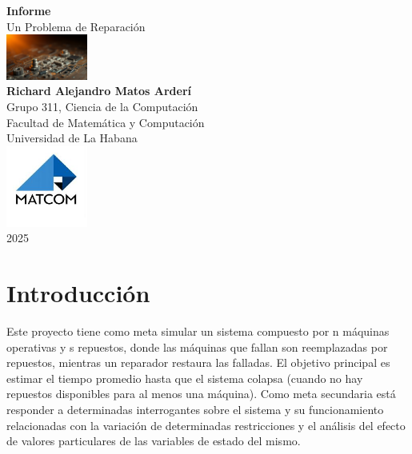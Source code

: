 \documentclass[a4paper, 12pt]{article}
\begin{document}
\graphicspath{{./}}

\begin{titlepage}
    \centering
    \vspace*{2cm}
    {\huge\bfseries Informe\\[0.4cm]}
    {\LARGE Un Problema de Reparación \\}
    \vspace*{2cm}
    \includegraphics[width=0.2\textwidth, height=0.2\textheight]{Images/Presentacion.png}\\[0.5cm]
   
    {\Large \textbf{Richard Alejandro Matos Arderí}\\[0.5cm]}
    {\Large Grupo 311, Ciencia de la Computación\\[0.5cm]}
    {\Large Facultad de Matemática y Computación\\[0.5cm]}
    {\Large Universidad de La Habana\\[0.5cm]}
    \vfill
    \includegraphics[width=0.2\textwidth, height=0.2\textheight]{Images/MATCOM.jpg}\\[0.5cm]
    {\Large 2025}
\end{titlepage}

\newpage
\tableofcontents
\newpage


\section{Introducción}
Este proyecto tiene como meta simular un sistema compuesto por n máquinas operativas y s repuestos, donde las máquinas que fallan son reemplazadas por repuestos, mientras un reparador restaura las falladas. El objetivo principal es estimar el tiempo promedio hasta que el sistema colapsa (cuando no hay repuestos disponibles para al menos una máquina). Como meta secundaria está responder a determinadas interrogantes sobre el sistema y su funcionamiento relacionadas con la variación de determinadas restricciones y el análisis del efecto de valores particulares de las variables de estado del mismo.
\end{document}
